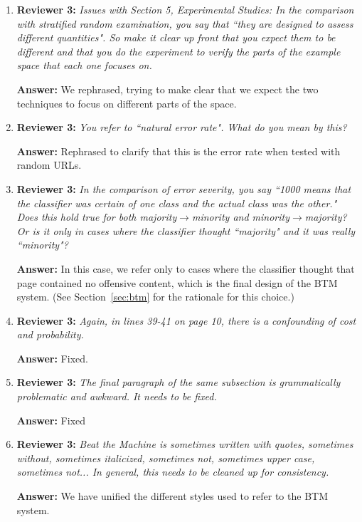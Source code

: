 \documentclass[letterpaper]{article}
\begin{document}
\begin{enumerate}
\item \textbf{Reviewer 3:} \emph{Issues with Section 5, Experimental Studies: In the comparison with stratified random examination, you say that ``they are designed to assess different quantities".  So make it clear up front that you expect them to be different and that you do the experiment to verify the parts of the example space that each one focuses on.}

\textbf{Answer:} We rephrased, trying to make clear that we expect the two techniques to focus on different parts of the space.

\item \textbf{Reviewer 3:} \emph{ You refer to ``natural error rate".  What do you mean by this?}

\textbf{Answer:} Rephrased to clarify that this is the error rate when tested with random URLs.

\item \textbf{Reviewer 3:} \emph{ In the comparison of error severity, you say ``1000 means that the classifier was certain of one class and the actual class was the other."  Does this hold true for both majority$\rightarrow$minority and minority$\rightarrow$majority?  Or is it only in cases where the classifier thought ``majority" and it was really ``minority"?}

\textbf{Answer:} In this case, we refer only to cases where the classifier thought that page contained no offensive content, which is the final design of the BTM system. (See Section~\ref{sec:btm} for the rationale for this choice.)

\item \textbf{Reviewer 3:} \emph{ Again, in lines 39-41 on page 10, there is a confounding of cost and probability.}

\textbf{Answer:} Fixed.

\item \textbf{Reviewer 3:} \emph{ The final paragraph of the same subsection is grammatically problematic and awkward.  It needs to be fixed.}

\textbf{Answer:} Fixed

\item \textbf{Reviewer 3:} \emph{ Beat the Machine is sometimes written with quotes, sometimes without, sometimes italicized, sometimes not, sometimes upper case, sometimes not... In general, this needs to be cleaned up for consistency.}

\textbf{Answer:} We have unified the different styles used to refer to the BTM system.


\end{enumerate}
\end{document}
